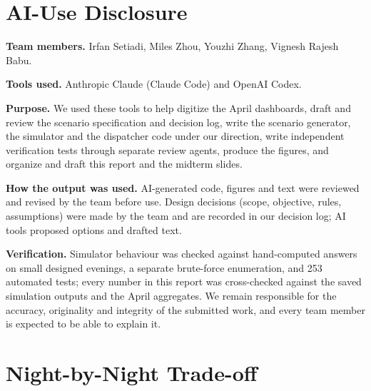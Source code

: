 \documentclass{article}
\begin{document}
\section*{AI-Use Disclosure}

\textbf{Team members.} Irfan Setiadi, Miles Zhou, Youzhi Zhang, Vignesh Rajesh Babu.

\textbf{Tools used.} Anthropic Claude (Claude Code) and OpenAI Codex.

\textbf{Purpose.} We used these tools to help digitize the April dashboards, draft and review the scenario specification and decision log, write the scenario generator, the simulator and the dispatcher code under our direction, write independent verification tests through separate review agents, produce the figures, and organize and draft this report and the midterm slides.

\textbf{How the output was used.} AI-generated code, figures and text were reviewed and revised by the team before use. Design decisions (scope, objective, rules, assumptions) were made by the team and are recorded in our decision log; AI tools proposed options and drafted text.

\textbf{Verification.} Simulator behaviour was checked against hand-computed answers on small designed evenings, a separate brute-force enumeration, and 253 automated tests; every number in this report was cross-checked against the saved simulation outputs and the April aggregates. We remain responsible for the accuracy, originality and integrity of the submitted work, and every team member is expected to be able to explain it.

\appendix
\onecolumn
\section{Night-by-Night Trade-off}\label{app:nights}
\end{document}
